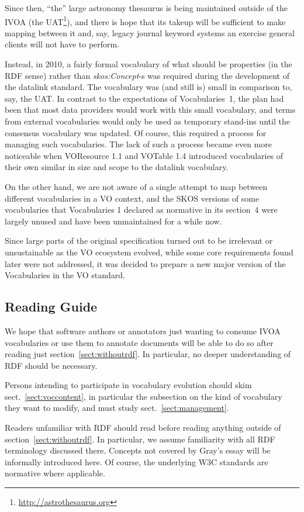 \documentclass[11pt,a4paper]{ivoa}
\newcommand{\vocterm}[1]{\emph{\color{termcolor}#1}}
\begin{document}
Since then, ``the'' large astronomy thesaurus is being maintained
outside of the IVOA (the UAT\footnote{\url{http://astrothesaurus.org}}),
and there is hope that its takeup will be sufficient to make mapping
between it and, say, legacy journal keyword systems an exercise general
clients will not have to perform.

Instead, in 2010, a fairly formal vocabulary of what
should be properties (in the RDF sense) rather than \vocterm{skos:Concept}-s
was required during the development of the datalink standard.  The
vocabulary was (and still is) small in comparison to, say, the UAT.  In
contrast to the expectations of Vocabularies~1, the plan had been that
most data providers would work with this small vocabulary, and terms
from external vocabularies would only be used as temporary stand-ins
until the consensus vocabulary was updated.  Of course, this required a
process for managing such vocabularies.  The lack of such a process
became even more noticeable when VOResource 1.1 and VOTable 1.4
introduced vocabularies of their own similar in size and scope to the
datalink vocabulary.

On the other hand, we are not aware of a single attempt to map
between different vocabularies in a VO context, and the SKOS versions of
some vocabularies that Vocabularies 1 declared as normative in its
section~4 were largely unused and have been unmaintained for a while now.

Since large parts of the original specification turned out to be
irrelevant or unsustainable as the VO ecosystem evolved, 
while some core requirements found later
were not addressed, it was decided to prepare a new major version of the
Vocabularies in the VO standard.

\subsection{Reading Guide}

We hope that software authors or annotators just wanting to consume IVOA
vocabularies or use them to annotate documents will be able to
do so after reading just section~\ref{sect:withoutrdf}.  In particular, no
deeper understanding of RDF should be necessary.

Persons intending to participate in vocabulary evolution should skim
sect.~\ref{sect:voccontent}, in particular the subsection on the kind of
vocabulary they want to modify, and must study
sect.~\ref{sect:management}.

Readers unfamiliar with RDF should read \citet{local:normanspaper} before
reading anything outside of section~\ref{sect:withoutrdf}.  
In particular, we assume familiarity with all RDF
terminology discussed there.  Concepts not covered by Gray's
essay will be informally introduced here.  Of course, the
underlying W3C standards are normative where applicable.
\end{document}
